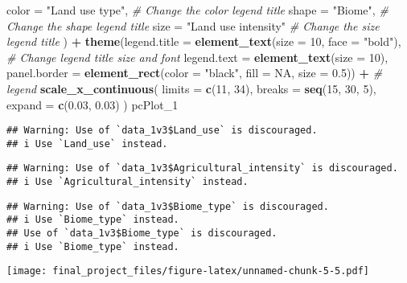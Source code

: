 \documentclass[
]{article}
\newenvironment{Shaded}{\begin{snugshade}}{\end{snugshade}}
\newcommand{\AttributeTok}[1]{\textcolor[rgb]{0.13,0.29,0.53}{#1}}
\newcommand{\CommentTok}[1]{\textcolor[rgb]{0.56,0.35,0.01}{\textit{#1}}}
\newcommand{\ConstantTok}[1]{\textcolor[rgb]{0.56,0.35,0.01}{#1}}
\newcommand{\DecValTok}[1]{\textcolor[rgb]{0.00,0.00,0.81}{#1}}
\newcommand{\FloatTok}[1]{\textcolor[rgb]{0.00,0.00,0.81}{#1}}
\newcommand{\FunctionTok}[1]{\textcolor[rgb]{0.13,0.29,0.53}{\textbf{#1}}}
\newcommand{\NormalTok}[1]{#1}
\newcommand{\SpecialCharTok}[1]{\textcolor[rgb]{0.81,0.36,0.00}{\textbf{#1}}}
\newcommand{\StringTok}[1]{\textcolor[rgb]{0.31,0.60,0.02}{#1}}
\begin{document}
\begin{Shaded}
\begin{Highlighting}[]
    \AttributeTok{color =} \StringTok{"Land use type"}\NormalTok{,  }\CommentTok{\# Change the color legend title}
    \AttributeTok{shape =} \StringTok{"Biome"}\NormalTok{,    }\CommentTok{\# Change the shape legend title}
    \AttributeTok{size =} \StringTok{"Land use intensity"}           \CommentTok{\# Change the size legend title}
\NormalTok{  ) }\SpecialCharTok{+}
  \FunctionTok{theme}\NormalTok{(}\AttributeTok{legend.title =} \FunctionTok{element\_text}\NormalTok{(}\AttributeTok{size =} \DecValTok{10}\NormalTok{, }\AttributeTok{face =} \StringTok{"bold"}\NormalTok{),  }\CommentTok{\# Change legend title size and font}
        \AttributeTok{legend.text =} \FunctionTok{element\_text}\NormalTok{(}\AttributeTok{size =} \DecValTok{10}\NormalTok{),}
        \AttributeTok{panel.border =} \FunctionTok{element\_rect}\NormalTok{(}\AttributeTok{color =} \StringTok{"black"}\NormalTok{, }\AttributeTok{fill =} \ConstantTok{NA}\NormalTok{, }\AttributeTok{size =} \FloatTok{0.5}\NormalTok{)) }\SpecialCharTok{+} \CommentTok{\# legend}
  \FunctionTok{scale\_x\_continuous}\NormalTok{(}
    \AttributeTok{limits =} \FunctionTok{c}\NormalTok{(}\DecValTok{11}\NormalTok{, }\DecValTok{34}\NormalTok{),      }
    \AttributeTok{breaks =} \FunctionTok{seq}\NormalTok{(}\DecValTok{15}\NormalTok{, }\DecValTok{30}\NormalTok{, }\DecValTok{5}\NormalTok{),}
    \AttributeTok{expand =} \FunctionTok{c}\NormalTok{(}\FloatTok{0.03}\NormalTok{, }\FloatTok{0.03}\NormalTok{)}
\NormalTok{  )}
\NormalTok{pcPlot\_1}
\end{Highlighting}
\end{Shaded}

\begin{verbatim}
## Warning: Use of `data_1v3$Land_use` is discouraged.
## i Use `Land_use` instead.
\end{verbatim}

\begin{verbatim}
## Warning: Use of `data_1v3$Agricultural_intensity` is discouraged.
## i Use `Agricultural_intensity` instead.
\end{verbatim}

\begin{verbatim}
## Warning: Use of `data_1v3$Biome_type` is discouraged.
## i Use `Biome_type` instead.
## Use of `data_1v3$Biome_type` is discouraged.
## i Use `Biome_type` instead.
\end{verbatim}

\texttt{[image: final\_project\_files/figure-latex/unnamed-chunk-5-5.pdf]}
\end{document}
